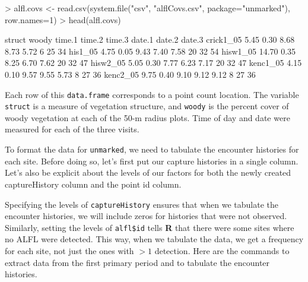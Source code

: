 \documentclass[a4paper]{article}
\renewenvironment{Schunk}{\vspace{\topsep}}{\vspace{\topsep}}
\begin{document}
\begin{Schunk}
\begin{Sinput}
> alfl.covs <- read.csv(system.file("csv", "alflCovs.csv",
     package="unmarked"), row.names=1)
> head(alfl.covs)
\end{Sinput}
\begin{Soutput}
          struct woody time.1 time.2 time.3 date.1 date.2 date.3
crick1_05   5.45  0.30   8.68   8.73   5.72      6     25     34
his1_05     4.75  0.05   9.43   7.40   7.58     20     32     54
hisw1_05   14.70  0.35   8.25   6.70   7.62     20     32     47
hisw2_05    5.05  0.30   7.77   6.23   7.17     20     32     47
kenc1_05    4.15  0.10   9.57   9.55   5.73      8     27     36
kenc2_05    9.75  0.40   9.10   9.12   9.12      8     27     36
\end{Soutput}
\end{Schunk}
Each row of this \texttt{data.frame} corresponds to a point count
location. The variable \texttt{struct} is a measure of vegetation
structure, and \texttt{woody} is the percent cover of woody vegetation
at each of the 50-m radius plots. Time of day and date were measured
for each of the three visits.

To format the data for \texttt{unmarked}, we need to tabulate the
encounter histories for each site. Before doing so, let's first put
our capture histories in a single column. Let's also be explicit about
the levels of our factors for both the newly created captureHistory
column and the point id column.

\begin{Schunk}
\end{Schunk}
Specifying the levels of \texttt{captureHistory} ensures that when we
tabulate the encounter histories, we will include zeros for histories
that were not observed. Similarly, setting the levels of
\texttt{alfl\$id} tells \textbf{R} that there
were some sites where no ALFL were detected. This way, when we
tabulate the data, we get a frequency for each site, not just the ones
with $>1$ detection. Here are the commands to extract data from the
first primary period and to tabulate the encounter
histories.
\end{document}
